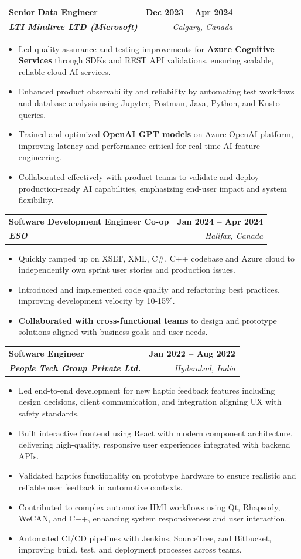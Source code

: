 \documentclass[letterpaper,11pt]{article}
\makeatletter
\newcommand{\resumeItem}[1]{
  \item\small{
    {#1 \vspace{-2pt}}
  }
}
\newcommand{\resumeSubheading}[4]{
  \vspace{-2pt}\item
    \begin{tabular*}{1.0\textwidth}[t]{l@{\extracolsep{\fill}}r}
      \textbf{#1} & \textbf{\small #2} \\
      \textit{\small#3} & \textit{\small #4} \\
    \end{tabular*}\vspace{-7pt}
}
\newcommand{\resumeItemListStart}{\begin{itemize}}
\newcommand{\resumeItemListEnd}{\end{itemize}\vspace{-5pt}}
\makeatother
\begin{document}
    \resumeSubheading
      {\textbf{Senior Data Engineer}}{\textbf{Dec 2023 -- Apr 2024}}
      {\textbf{LTI Mindtree LTD (Microsoft)}}{Calgary, Canada}
      \resumeItemListStart
        \resumeItem{Led quality assurance and testing improvements for \textbf{Azure Cognitive Services} through SDKs and REST API validations, ensuring scalable, reliable cloud AI services.}
        \resumeItem{Enhanced product observability and reliability by automating test workflows and database analysis using Jupyter, Postman, Java, Python, and Kusto queries.}
        \resumeItem{Trained and optimized \textbf{OpenAI GPT models} on Azure OpenAI platform, improving latency and performance critical for real-time AI feature engineering.}
        \resumeItem{Collaborated effectively with product teams to validate and deploy production-ready AI capabilities, emphasizing end-user impact and system flexibility.}
      \resumeItemListEnd
    
    \resumeSubheading
      {\textbf{Software Development Engineer Co-op}}{\textbf{Jan 2024 -- Apr 2024}}
      {\textbf{ESO}}{Halifax, Canada}
      \resumeItemListStart
        \resumeItem{Quickly ramped up on XSLT, XML, C\#, C++ codebase and Azure cloud to independently own sprint user stories and production issues.}
        \resumeItem{Introduced and implemented code quality and refactoring best practices, improving development velocity by 10-15\%.}
        \resumeItem{\textbf{Collaborated with cross-functional teams} to design and prototype solutions aligned with business goals and user needs.}
      \resumeItemListEnd

    \resumeSubheading
      {\textbf{Software Engineer}}{\textbf{Jan 2022 -- Aug 2022}}
      {\textbf{People Tech Group Private Ltd.}}{Hyderabad, India}
      \resumeItemListStart
        \resumeItem{Led end-to-end development for new haptic feedback features including design decisions, client communication, and integration aligning UX with safety standards.}
        \resumeItem{Built interactive frontend using React with modern component architecture, delivering high-quality, responsive user experiences integrated with backend APIs.}
        \resumeItem{Validated haptics functionality on prototype hardware to ensure realistic and reliable user feedback in automotive contexts.}
        \resumeItem{Contributed to complex automotive HMI workflows using Qt, Rhapsody, WeCAN, and C++, enhancing system responsiveness and user interaction.}
        \resumeItem{Automated CI/CD pipelines with Jenkins, SourceTree, and Bitbucket, improving build, test, and deployment processes across teams.}
      \resumeItemListEnd
\end{document}
